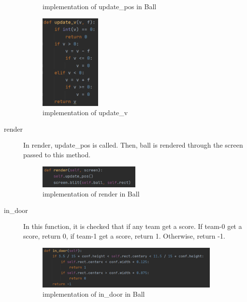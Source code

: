 \documentclass[14pt]{extarticle}
\begin{document}
\begin{description}
\begin{figure}[H]
\begin{center}
			\caption{implementation of update\_pos in Ball}
		\end{center}
	\end{figure}
	\begin{figure}[H]
		\begin{center}
			\includegraphics[width=0.3\textwidth]{update_v}
			\caption{implementation of update\_v}
		\end{center}
	\end{figure}
	\item[render]
	In render, update\_pos is called. Then, ball is rendered through the screen passed to this method.
	\begin{figure}[H]
		\begin{center}
			\includegraphics[width=0.5\textwidth]{Ball_render}
			\caption{implementation of render in Ball}
		\end{center}
	\end{figure}
	\item[in\_door]
	In this function, it is checked that if any team get a score. If team-0 get a score, return 0, if team-1 get a score, return 1. Otherwise, return -1.
	\begin{figure}[H]
		\begin{center}
			\includegraphics[width=0.9\textwidth]{Ball_in_door}
			\caption{implementation of in\_door in Ball}
		\end{center}
	\end{figure}
\end{description}
\end{document}
